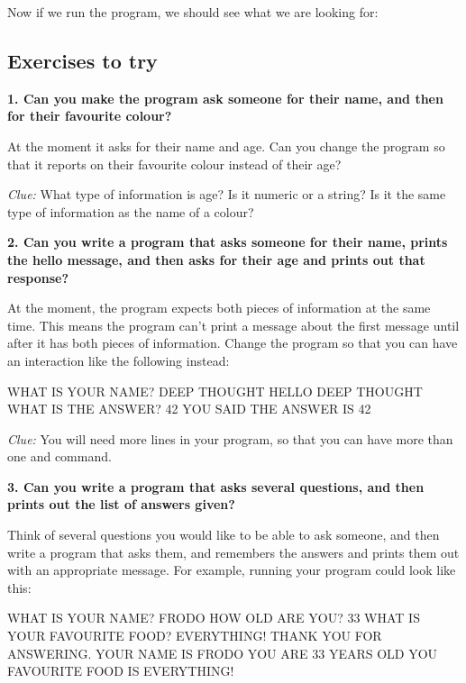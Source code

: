 \needspace{4cm}
Now if we run the program, we should see what we are looking for:


  \subsection{Exercises to try}

  {\bf 1. Can you make the program ask someone for their name, and
    then for their favourite colour?}

  At the moment it asks for their name and age. Can you change the
  program so that it reports on their favourite colour instead of
  their age?

  {\em Clue:} What type of information is age? Is it numeric or a
  string? Is it the same type of information as the name of a colour?

  {\bf 2. Can you write a program that asks someone for their name,
    prints the hello message, and then asks for their age and prints
    out that response?}

  \needspace{2cm}
  At the moment, the program expects both pieces of information at
  the same time. This means the program can't print a message about
  the first message until after it has both pieces of information.
  Change the program so that you can have an interaction like the
  following instead:

\begin{screencode}
WHAT IS YOUR NAME? DEEP THOUGHT
HELLO DEEP THOUGHT
WHAT IS THE ANSWER? 42
YOU SAID THE ANSWER IS 42
\end{screencode}

{\em Clue:} You will need more lines in your program, so that you
can have more than one  and  command.

{\bf 3. Can you write a program that asks several questions, and
  then prints out the list of answers given?}

\needspace{2cm}
Think of several questions you would like to be able to ask someone,
and then write a program that asks them, and remembers the answers
and prints them out with an appropriate message. For example, running
your program could look like this:

\begin{screencode}
  WHAT IS YOUR NAME? FRODO
  HOW OLD ARE YOU? 33
  WHAT IS YOUR FAVOURITE FOOD? EVERYTHING!
  THANK YOU FOR ANSWERING.
  YOUR NAME IS FRODO
  YOU ARE 33 YEARS OLD
  YOU FAVOURITE FOOD IS EVERYTHING!
\end{screencode}

